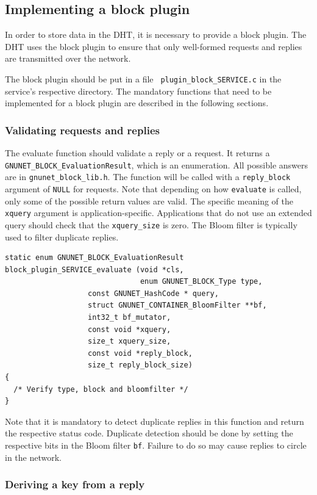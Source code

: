 \documentclass[10pt]{article}
\begin{document}
\subsection{Implementing a block plugin}

In order to store data in the DHT, it is necessary to provide a block
plugin.  The DHT uses the block plugin to ensure that only well-formed
requests and replies are transmitted over the network.

The block plugin should be put in a file {\tt
  plugin\_block\_SERVICE.c} in the service's respective directory. The
mandatory functions that need to be implemented for a block plugin are
described in the following sections.

\subsubsection{Validating requests and replies}

The evaluate function should validate a reply or a request. It returns
a {\tt GNUNET\_BLOCK\_EvaluationResult}, which is an enumeration. All
possible answers are in {\tt gnunet\_block\_lib.h}.  The function will
be called with a {\tt reply\_block} argument of {\tt NULL} for
requests.  Note that depending on how {\tt evaluate} is called, only
some of the possible return values are valid.  The specific meaning of
the {\tt xquery} argument is application-specific.  Applications that
do not use an extended query should check that the {\tt xquery\_size}
is zero.  The Bloom filter is typically used to filter duplicate
replies.

\lstset{language=C}
\begin{lstlisting}
static enum GNUNET_BLOCK_EvaluationResult
block_plugin_SERVICE_evaluate (void *cls,
                               enum GNUNET_BLOCK_Type type,
			       const GNUNET_HashCode * query,
			       struct GNUNET_CONTAINER_BloomFilter **bf,
			       int32_t bf_mutator,
			       const void *xquery,
			       size_t xquery_size,
			       const void *reply_block,
			       size_t reply_block_size)
{
  /* Verify type, block and bloomfilter */
}
\end{lstlisting}

Note that it is mandatory to detect duplicate replies in this 
function and return the respective status code.  Duplicate 
detection should be done by setting the respective bits in
the Bloom filter {\tt bf}.  Failure to do so may cause replies
to circle in the network.

\subsubsection{Deriving a key from a reply}
\end{document}
